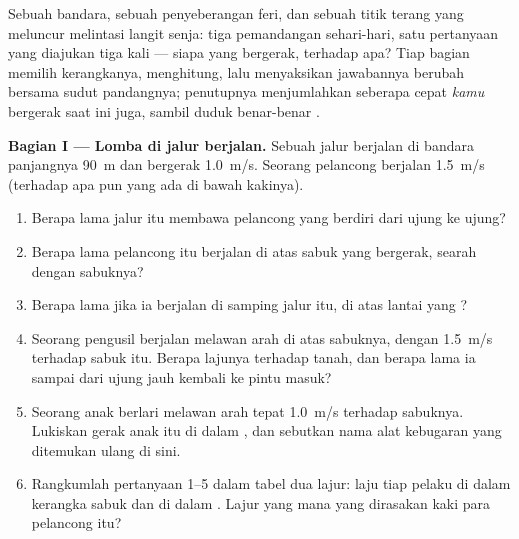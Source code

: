 \begin{problem}
\label{pb:g10:relative-motion:1}
Sebuah bandara, sebuah penyeberangan feri, dan sebuah titik terang yang
meluncur melintasi langit senja: tiga pemandangan sehari-hari, satu
pertanyaan yang diajukan tiga kali --- siapa yang bergerak, terhadap
apa? Tiap bagian memilih kerangkanya, menghitung, lalu menyaksikan
jawabannya berubah bersama sudut pandangnya; penutupnya menjumlahkan
seberapa cepat \emph{kamu} bergerak saat ini juga, sambil duduk
benar-benar .

\medskip
\noindent\textbf{Bagian I --- Lomba di jalur berjalan.}
Sebuah jalur berjalan di bandara panjangnya \qty{90}{m} dan bergerak
\qty{1.0}{m/s}. Seorang pelancong berjalan \qty{1.5}{m/s} (terhadap apa
pun yang ada di bawah kakinya).
\begin{enumerate}
  \item Berapa lama jalur itu membawa pelancong yang berdiri  dari
        ujung ke ujung?
  \item Berapa lama pelancong itu berjalan di atas sabuk yang bergerak,
        searah dengan sabuknya?
  \item Berapa lama jika ia berjalan di samping jalur itu, di atas
        lantai yang ?
  \item Seorang pengusil berjalan melawan arah di atas sabuknya, dengan
        \qty{1.5}{m/s} terhadap sabuk itu. Berapa lajunya terhadap
        tanah, dan berapa lama ia sampai dari ujung jauh kembali ke
        pintu masuk?
  \item Seorang anak berlari melawan arah tepat \qty{1.0}{m/s} terhadap
        sabuknya. Lukiskan gerak anak itu di dalam , dan
        sebutkan nama alat kebugaran yang ditemukan ulang di sini.
  \item Rangkumlah pertanyaan 1--5 dalam tabel dua lajur: laju tiap
        pelaku di dalam kerangka sabuk dan di dalam .
        Lajur yang mana yang dirasakan kaki para pelancong itu?
\end{enumerate}


\end{problem}
